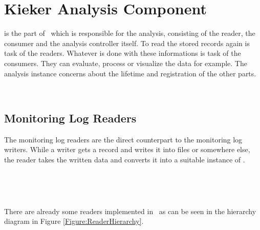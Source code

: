 % 


\chapter{Kieker Analysis Component}\label{chap:componentsAnalysis}
	
	\class{\KiekerAnalysisPart} is the part of \Kieker\  which is responsible for the analysis, consisting of the reader, the consumer and the analysis controller itself. To read the stored records again is task of the readers. Whatever is done with these informations is task of the consumers. They can evaluate, process or visualize the data for example. The analysis instance concerns about the lifetime and registration of the other parts.

\


	\section{Monitoring Log Readers}

		The monitoring log readers are the direct counterpart to the monitoring log writers. While a writer gets a record and writes it into files or somewhere else, the reader takes the written data and converts it into a suitable instance of .

\


\

		\noindent There are already some readers implemented in \Kieker\  as can be seen in the hierarchy diagram in Figure \ref{Figure:ReaderHierarchy}.

